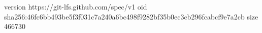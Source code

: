 version https://git-lfs.github.com/spec/v1
oid sha256:46fc6bb493be5f3f031c7a240a6bc498f9282bf35b0ec3cb296fcabcf9e7a2cb
size 466730
